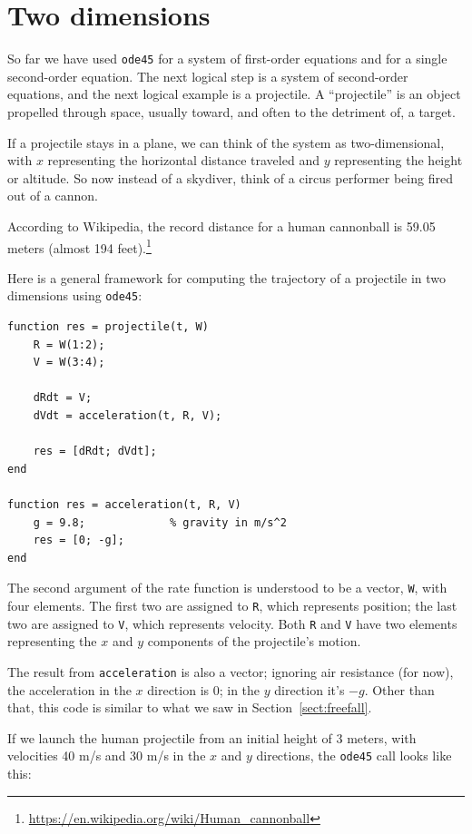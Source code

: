 \documentclass[
]{book}
\begin{document}
\section{Two dimensions}
\label{sect:projectile}

So far we have used {\tt ode45} for a system of first-order
equations and for a single second-order equation.  The next logical
step is a system of second-order equations, and the next logical example
is a projectile.  A ``projectile'' is an object propelled
through space, usually toward,
and often to the detriment of,
a target.

If a projectile stays in a plane, we can think of the system as
two-dimensional, with $x$ representing the horizontal distance
traveled and $y$ representing the height or altitude.  So now
instead of a skydiver, think of a circus performer being fired
out of a cannon.

According to Wikipedia, the record distance for a human cannonball is
59.05 meters (almost 194
feet).\footnote{\url{https://en.wikipedia.org/wiki/Human_cannonball}}

Here is a general framework for computing the trajectory of a projectile
in two dimensions using {\tt ode45}:

\begin{verbatim}
function res = projectile(t, W)
    R = W(1:2);
    V = W(3:4);

    dRdt = V;
    dVdt = acceleration(t, R, V);

    res = [dRdt; dVdt];
end

function res = acceleration(t, R, V)
    g = 9.8;             % gravity in m/s^2
    res = [0; -g];
end
\end{verbatim}

The second argument of the rate function is understood to be a vector,
{\tt W}, with four elements.  The first two are assigned to {\tt R},
which represents position; the last two are assigned to {\tt V}, which
represents velocity. Both {\tt R} and {\tt V} have two elements
representing the $x$ and $y$ components of the projectile's motion.

The result from
{\tt acceleration} is also a vector; ignoring air resistance
(for now), the acceleration in the $x$ direction is 0; in
the $y$ direction it's $-g$.
Other than that, this code is similar to what we saw in
Section~\ref{sect:freefall}.

If we launch the human projectile from an initial height of
3 meters, with velocities 40 m/s and 30 m/s in the $x$ and $y$
directions, the {\tt ode45} call looks like
this:
\end{document}
